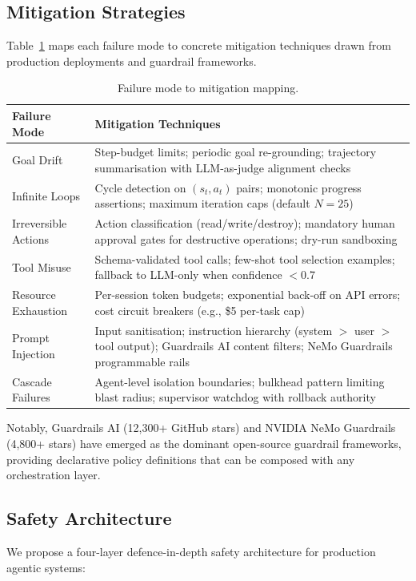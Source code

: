 \documentclass[12pt, a4paper]{article}
\begin{document}
\subsection{Mitigation Strategies}
Table~\ref{tab:mitigations} maps each failure mode to concrete mitigation techniques drawn from production deployments and guardrail frameworks.

\begin{table}[h]
\caption{Failure mode to mitigation mapping.}
\label{tab:mitigations}
\begin{tabular}{p{2.5cm}p{9cm}}
\toprule
\textbf{Failure Mode} & \textbf{Mitigation Techniques} \\
\midrule
Goal Drift & Step-budget limits; periodic goal re-grounding; trajectory summarisation with LLM-as-judge alignment checks \\
Infinite Loops & Cycle detection on $(s_t, a_t)$ pairs; monotonic progress assertions; maximum iteration caps (default $N{=}25$) \\
Irreversible Actions & Action classification (read/write/destroy); mandatory human approval gates for destructive operations; dry-run sandboxing \\
Tool Misuse & Schema-validated tool calls; few-shot tool selection examples; fallback to LLM-only when confidence $< 0.7$ \\
Resource Exhaustion & Per-session token budgets; exponential back-off on API errors; cost circuit breakers (e.g., \$5 per-task cap) \\
Prompt Injection & Input sanitisation; instruction hierarchy (system $>$ user $>$ tool output); Guardrails AI content filters; NeMo Guardrails programmable rails \\
Cascade Failures & Agent-level isolation boundaries; bulkhead pattern limiting blast radius; supervisor watchdog with rollback authority \\
\bottomrule
\end{tabular}
\end{table}

Notably, Guardrails AI (12,300+ GitHub stars) and NVIDIA NeMo Guardrails (4,800+ stars) have emerged as the dominant open-source guardrail frameworks, providing declarative policy definitions that can be composed with any orchestration layer.

\subsection{Safety Architecture}
We propose a four-layer defence-in-depth safety architecture for production agentic systems:
\end{document}
